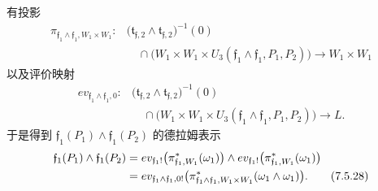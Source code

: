 有投影
\[
\begin{aligned}
\pi_{\mathfrak f_1\wedge\mathfrak f_1,W_1\times W_1}\colon
&\bigl(\mathfrak t_{\mathfrak f,2}
\wedge\mathfrak t_{\mathfrak f,2}\bigr)^{-1}(0)\\
&\quad\cap
\bigl(W_1\times W_1\times
U_3(\mathfrak f_1\wedge\mathfrak f_1,P_1,P_2)\bigr)
\longrightarrow W_1\times W_1
\end{aligned}
\]
以及评价映射
\[
\begin{aligned}
ev_{\mathfrak f_1\wedge\mathfrak f_1,0}\colon
&\bigl(\mathfrak t_{\mathfrak f,2}
\wedge\mathfrak t_{\mathfrak f,2}\bigr)^{-1}(0)\\
&\quad\cap
\bigl(W_1\times W_1\times
U_3(\mathfrak f_1\wedge\mathfrak f_1,P_1,P_2)\bigr)
\longrightarrow L.
\end{aligned}
\]
于是得到
$\mathfrak f_1(P_1)\wedge\mathfrak f_1(P_2)$ 的德拉姆表示
\begin{align}
\mathfrak f_1(P_1)\wedge\mathfrak f_1(P_2)
={}&ev_{\mathfrak f_1!}
\bigl(\pi_{\mathfrak f_1,W_1}^*(\omega_1)\bigr)
\wedge
ev_{\mathfrak f_1!}
\bigl(\pi_{\mathfrak f_1,W_1}^*(\omega_1)\bigr)
\notag\\
={}&ev_{\mathfrak f_1\wedge\mathfrak f_1,0!}
\bigl(
\pi_{\mathfrak f_1\wedge\mathfrak f_1,W_1\times W_1}^*
(\omega_1\wedge\omega_1)
\bigr).
\tag{7.5.28}\label{eq:7-5-28}
\end{align}

